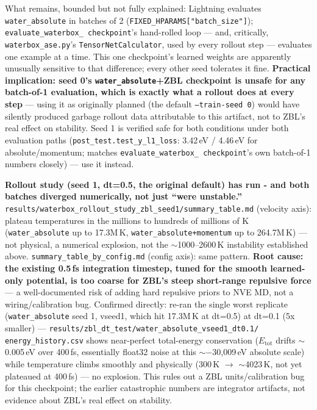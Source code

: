 \documentclass[11pt]{article}
\begin{document}
What remains, bounded but not fully explained: Lightning evaluates
\texttt{water\_absolute} in batches of 2
(\texttt{FIXED\_HPARAMS["batch\_size"]}); \texttt{evaluate\_waterbox\_
checkpoint}'s hand-rolled loop --- and, critically,
\texttt{waterbox\_ase.py}'s \texttt{TensorNetCalculator}, used by every
rollout step --- evaluates one example at a time. This one checkpoint's
learned weights are apparently unusually sensitive to that difference; every
other seed tolerates it fine. \textbf{Practical implication: seed 0's
\texttt{water\_absolute}+ZBL checkpoint is unsafe for any batch-of-1
evaluation, which is exactly what a rollout does at every step} --- using it
as originally planned (the default \texttt{--train-seed 0}) would have
silently produced garbage rollout data attributable to this artifact, not to
ZBL's real effect on stability. Seed 1 is verified safe for both conditions
under both evaluation paths (\texttt{post\_test.test\_y\_l1\_loss}: 3.42\,eV
/ 4.46\,eV for absolute/momentum; matches \texttt{evaluate\_waterbox\_
checkpoint}'s own batch-of-1 numbers closely) --- use it instead.

\textbf{Rollout study (seed 1, dt=0.5, the original default) has run - and
both batches diverged numerically, not just ``were unstable.''}
\texttt{results/waterbox\_rollout\_study\_zbl\_seed1/summary\_table.md}
(velocity axis): plateau temperatures in the millions to hundreds of
millions of K (\texttt{water\_absolute} up to 17.3M\,K,
\texttt{water\_absolute+momentum} up to 264.7M\,K) --- not physical, a
numerical explosion, not the $\sim$1000--2600\,K instability established
above. \texttt{summary\_table\_by\_config.md} (config axis): same pattern.
\textbf{Root cause: the existing 0.5\,fs integration timestep, tuned for the
smooth learned-only potential, is too coarse for ZBL's steep short-range
repulsive force} --- a well-documented risk of adding hard repulsive priors
to NVE MD, not a wiring/calibration bug. Confirmed directly: re-ran the
single worst replicate (\texttt{water\_absolute} seed 1, vseed1, which hit
17.3M\,K at dt=0.5) at dt=0.1 (5x smaller) ---
\texttt{results/zbl\_dt\_test/water\_absolute\_vseed1\_dt0.1/
energy\_history.csv} shows near-perfect total-energy conservation
($E_\text{tot}$ drifts $\sim$0.005\,eV over 400\,fs, essentially float32
noise at this $\sim{-}$30{,}009\,eV absolute scale) while temperature climbs
smoothly and physically (300\,K $\to$ $\sim$4023\,K, not yet plateaued at
400\,fs) --- no explosion. This rules out a ZBL units/calibration bug for
this checkpoint; the earlier catastrophic numbers are integrator artifacts,
not evidence about ZBL's real effect on stability.
\end{document}
